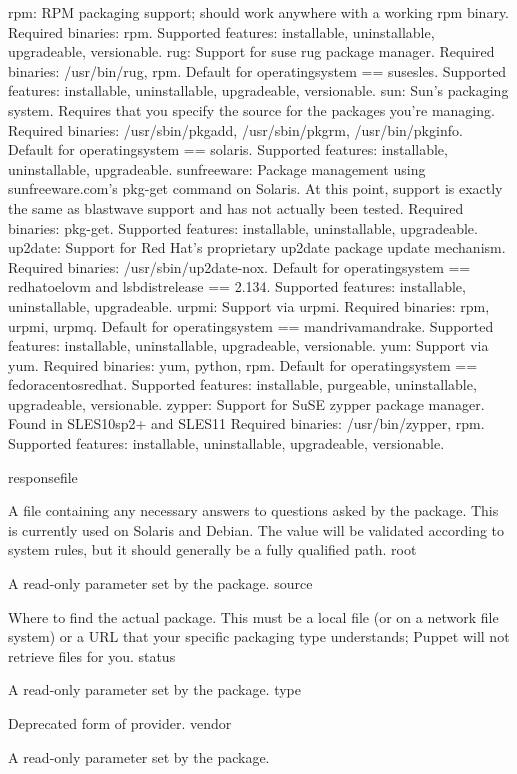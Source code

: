     rpm: RPM packaging support; should work anywhere with a working rpm binary. Required binaries: rpm. Supported features: installable, uninstallable, upgradeable, versionable.
    rug: Support for suse rug package manager. Required binaries: /usr/bin/rug, rpm. Default for operatingsystem == susesles. Supported features: installable, uninstallable, upgradeable, versionable.
    sun: Sun’s packaging system. Requires that you specify the source for the packages you’re managing. Required binaries: /usr/sbin/pkgadd, /usr/sbin/pkgrm, /usr/bin/pkginfo. Default for operatingsystem == solaris. Supported features: installable, uninstallable, upgradeable.
    sunfreeware: Package management using sunfreeware.com’s pkg-get command on Solaris. At this point, support is exactly the same as blastwave support and has not actually been tested. Required binaries: pkg-get. Supported features: installable, uninstallable, upgradeable.
    up2date: Support for Red Hat’s proprietary up2date package update mechanism. Required binaries: /usr/sbin/up2date-nox. Default for operatingsystem == redhatoelovm and lsbdistrelease == 2.134. Supported features: installable, uninstallable, upgradeable.
    urpmi: Support via urpmi. Required binaries: rpm, urpmi, urpmq. Default for operatingsystem == mandrivamandrake. Supported features: installable, uninstallable, upgradeable, versionable.
    yum: Support via yum. Required binaries: yum, python, rpm. Default for operatingsystem == fedoracentosredhat. Supported features: installable, purgeable, uninstallable, upgradeable, versionable.
    zypper: Support for SuSE zypper package manager. Found in SLES10sp2+ and SLES11 Required binaries: /usr/bin/zypper, rpm. Supported features: installable, uninstallable, upgradeable, versionable.

responsefile

A file containing any necessary answers to questions asked by the package. This is currently used on Solaris and Debian. The value will be validated according to system rules, but it should generally be a fully qualified path.
root

A read-only parameter set by the package.
source

Where to find the actual package. This must be a local file (or on a network file system) or a URL that your specific packaging type understands; Puppet will not retrieve files for you.
status

A read-only parameter set by the package.
type

Deprecated form of provider.
vendor

A read-only parameter set by the package.
